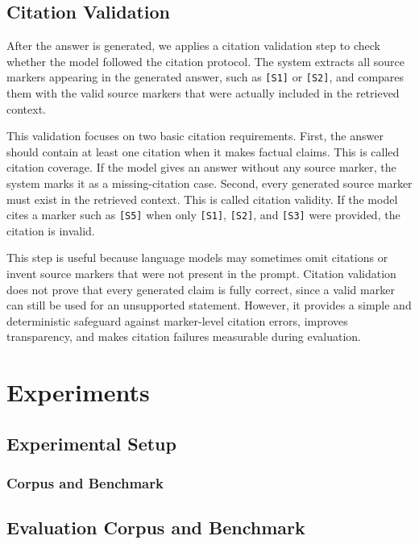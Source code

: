 \documentclass[11pt,a4paper]{article}
\begin{document}
\subsection{Citation Validation}

After the answer is generated, we applies a citation validation step
to check whether the model followed the citation protocol. The system extracts
all source markers appearing in the generated answer, such as \texttt{[S1]} or
\texttt{[S2]}, and compares them with the valid source markers that were
actually included in the retrieved context.

This validation focuses on two basic citation requirements. First, the answer
should contain at least one citation when it makes factual claims. This is
called citation coverage. If the model gives an answer without any source
marker, the system marks it as a missing-citation case. Second, every generated
source marker must exist in the retrieved context. This is called citation
validity. If the model cites a marker such as \texttt{[S5]} when only
\texttt{[S1]}, \texttt{[S2]}, and \texttt{[S3]} were provided, the citation is
invalid.

This step is useful because language models may sometimes omit citations or
invent source markers that were not present in the prompt. Citation validation
does not prove that every generated claim is fully correct, since a valid marker
can still be used for an unsupported statement. However, it provides a simple
and deterministic safeguard against marker-level citation errors, improves
transparency, and makes citation failures measurable during evaluation.


\section{Experiments}

\subsection{Experimental Setup}

\subsubsection{Corpus and Benchmark}

\subsection{Evaluation Corpus and Benchmark}
\end{document}
